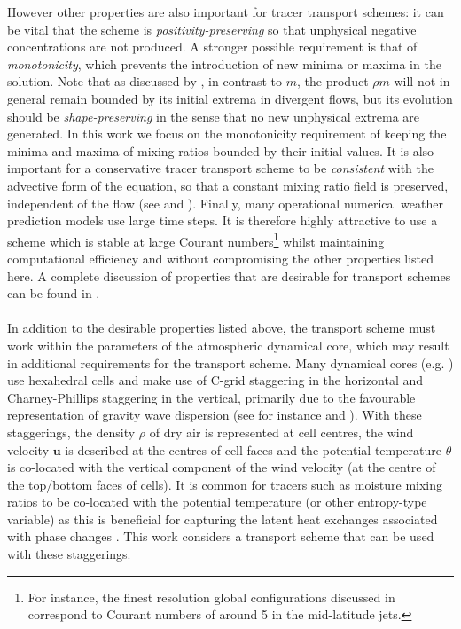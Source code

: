 \documentclass{ametsocV6.1}
\begin{document}
However other properties are also important for tracer transport schemes: it can be vital that the scheme is \textit{positivity-preserving} so that unphysical negative concentrations are not produced.
A stronger possible requirement is that of \textit{monotonicity}, which prevents the introduction of new minima or maxima in the solution.
Note that as discussed by \citet{lauritzen2011numerical}, in contrast to $m$, the product $\rho m$ will not in general remain bounded by its initial extrema in divergent flows, but its evolution should be \textit{shape-preserving} in the sense that no new unphysical extrema are generated.
In this work we focus on the monotonicity requirement of keeping the minima and maxima of mixing ratios bounded by their initial values.
It is also important for a conservative tracer transport scheme to be \textit{consistent} with the advective form of the equation, so that a constant mixing ratio field is preserved, independent of the flow (see \citep{jockel2001fundamental} and \citep{zhang2008consistency}).
Finally, many operational numerical weather prediction models use large time steps.
It is therefore highly attractive to use a scheme which is stable at large Courant numbers\footnote{For instance, the finest resolution global configurations discussed in \citet{walters2019met} correspond to Courant numbers of around 5 in the mid-latitude jets.}
whilst maintaining computational efficiency and without compromising the other properties listed here.
A complete discussion of properties that are desirable for transport schemes can be found in \citet{lauritzen2011numerical}.
\\
\\
In addition to the desirable properties listed above, the transport scheme must work within the parameters of the atmospheric dynamical core, which may result in additional requirements for the transport scheme.
Many dynamical cores (e.g. \citep{chen2008new,wood2014inherently,girard2014staggered,melvin2024mixed}) use hexahedral cells and make use of C-grid staggering in the horizontal and Charney-Phillips staggering \citep{charney1953verticalstaggering} in the vertical, primarily due to the favourable representation of gravity wave dispersion (see for instance \citet{staniforth2012horizontal} and \citet{thuburn2022numerical}). 
With these staggerings, the density $\rho$ of dry air is represented at cell centres, the wind velocity $\bm{u}$ is described at the centres of cell faces and the potential temperature $\theta$ is co-located with the vertical component of the wind velocity (at the centre of the top/bottom faces of cells).
It is common for tracers such as moisture mixing ratios to be co-located with the potential temperature (or other entropy-type variable) as this is beneficial for capturing the latent heat exchanges associated with phase changes \citep{bendall2023solution}.
This work considers a transport scheme that can be used with these staggerings.
\end{document}

